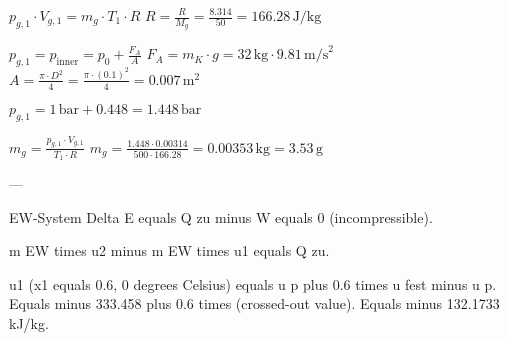 \( p_{g,1} \cdot V_{g,1} = m_{g} \cdot T_{1} \cdot R \)  
\( R = \frac{R}{M_{g}} = \frac{8.314}{50} = 166.28 \, \text{J/kg} \)  

\( p_{g,1} = p_{\text{inner}} = p_{0} + \frac{F_{A}}{A} \)  
\( F_{A} = m_{K} \cdot g = 32 \, \text{kg} \cdot 9.81 \, \text{m/s}^2 \)  
\( A = \frac{\pi \cdot D^2}{4} = \frac{\pi \cdot (0.1)^2}{4} = 0.007 \, \text{m}^2 \)  

\( p_{g,1} = 1 \, \text{bar} + 0.448 = 1.448 \, \text{bar} \)  

\( m_{g} = \frac{p_{g,1} \cdot V_{g,1}}{T_{1} \cdot R} \)  
\( m_{g} = \frac{1.448 \cdot 0.00314}{500 \cdot 166.28} = 0.00353 \, \text{kg} = 3.53 \, \text{g} \)  

---

EW-System  
Delta E equals Q zu minus W equals 0 (incompressible).  

m EW times u2 minus m EW times u1 equals Q zu.  

u1 (x1 equals 0.6, 0 degrees Celsius) equals u p plus 0.6 times u fest minus u p.  
Equals minus 333.458 plus 0.6 times (crossed-out value).  
Equals minus 132.1733 kJ/kg.